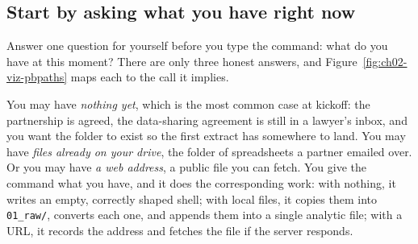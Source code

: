 \subsection{Start by asking what you have right now}\label{sec:ch02-pb-paths}
Answer one question for yourself before you type the command: what do you have at this moment? There are only three honest answers, and Figure~\ref{fig:ch02-viz-pbpaths} maps each to the call it implies.

You may have \emph{nothing yet}, which is the most common case at kickoff: the partnership is agreed, the data-sharing agreement is still in a lawyer's inbox, and you want the folder to exist so the first extract has somewhere to land. You may have \emph{files already on your drive}, the folder of spreadsheets a partner emailed over. Or you may have \emph{a web address}, a public file you can fetch. You give the command what you have, and it does the corresponding work: with nothing, it writes an empty, correctly shaped shell; with local files, it copies them into \texttt{01\_raw/}, converts each one, and appends them into a single analytic file; with a URL, it records the address and fetches the file if the server responds.


